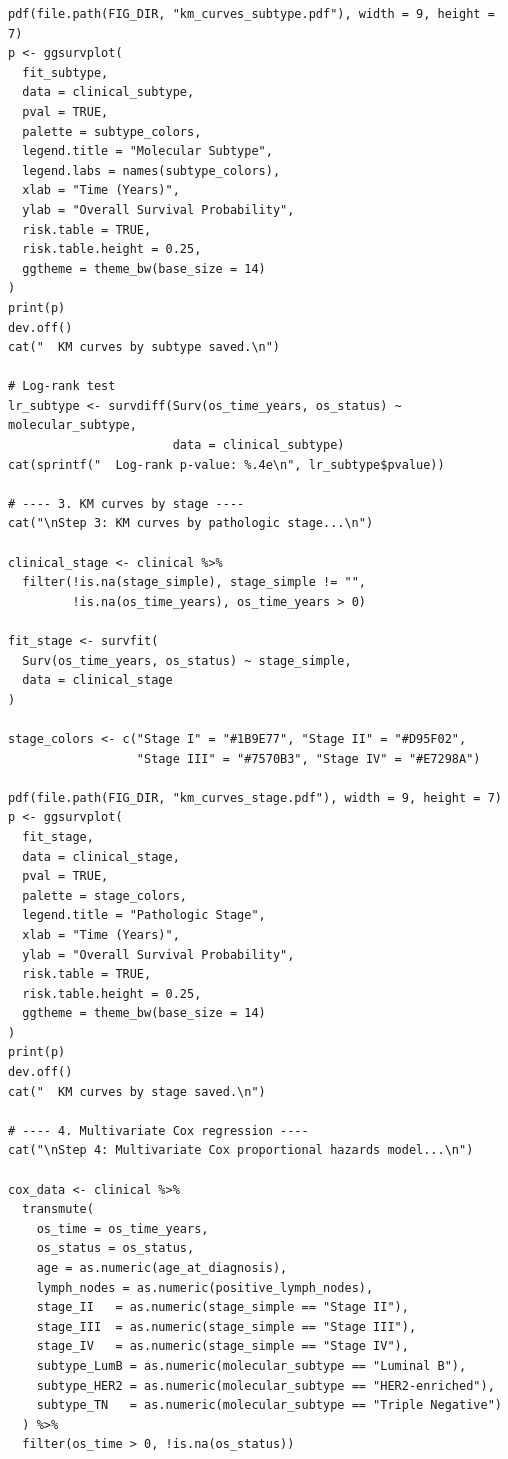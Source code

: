 \documentclass[12pt,a4paper]{ctexart}
\begin{document}
\begin{lstlisting}[caption={11_survival_analysis}, basicstyle=\ttfamily\scriptsize]
pdf(file.path(FIG_DIR, "km_curves_subtype.pdf"), width = 9, height = 7)
p <- ggsurvplot(
  fit_subtype,
  data = clinical_subtype,
  pval = TRUE,
  palette = subtype_colors,
  legend.title = "Molecular Subtype",
  legend.labs = names(subtype_colors),
  xlab = "Time (Years)",
  ylab = "Overall Survival Probability",
  risk.table = TRUE,
  risk.table.height = 0.25,
  ggtheme = theme_bw(base_size = 14)
)
print(p)
dev.off()
cat("  KM curves by subtype saved.\n")

# Log-rank test
lr_subtype <- survdiff(Surv(os_time_years, os_status) ~ molecular_subtype,
                       data = clinical_subtype)
cat(sprintf("  Log-rank p-value: %.4e\n", lr_subtype$pvalue))

# ---- 3. KM curves by stage ----
cat("\nStep 3: KM curves by pathologic stage...\n")

clinical_stage <- clinical %>%
  filter(!is.na(stage_simple), stage_simple != "",
         !is.na(os_time_years), os_time_years > 0)

fit_stage <- survfit(
  Surv(os_time_years, os_status) ~ stage_simple,
  data = clinical_stage
)

stage_colors <- c("Stage I" = "#1B9E77", "Stage II" = "#D95F02",
                  "Stage III" = "#7570B3", "Stage IV" = "#E7298A")

pdf(file.path(FIG_DIR, "km_curves_stage.pdf"), width = 9, height = 7)
p <- ggsurvplot(
  fit_stage,
  data = clinical_stage,
  pval = TRUE,
  palette = stage_colors,
  legend.title = "Pathologic Stage",
  xlab = "Time (Years)",
  ylab = "Overall Survival Probability",
  risk.table = TRUE,
  risk.table.height = 0.25,
  ggtheme = theme_bw(base_size = 14)
)
print(p)
dev.off()
cat("  KM curves by stage saved.\n")

# ---- 4. Multivariate Cox regression ----
cat("\nStep 4: Multivariate Cox proportional hazards model...\n")

cox_data <- clinical %>%
  transmute(
    os_time = os_time_years,
    os_status = os_status,
    age = as.numeric(age_at_diagnosis),
    lymph_nodes = as.numeric(positive_lymph_nodes),
    stage_II   = as.numeric(stage_simple == "Stage II"),
    stage_III  = as.numeric(stage_simple == "Stage III"),
    stage_IV   = as.numeric(stage_simple == "Stage IV"),
    subtype_LumB = as.numeric(molecular_subtype == "Luminal B"),
    subtype_HER2 = as.numeric(molecular_subtype == "HER2-enriched"),
    subtype_TN   = as.numeric(molecular_subtype == "Triple Negative")
  ) %>%
  filter(os_time > 0, !is.na(os_status))


\end{lstlisting}
\end{document}
